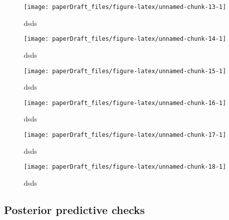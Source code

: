 \documentclass[
  12pt,
  dvipsnames,enabledeprecatedfontcommands]{scrartcl}
\begin{document}
\begin{figure}[H]


\begin{center}\texttt{[image: paperDraft\_files/figure-latex/unnamed-chunk-13-1]} \end{center}
\caption{dsds}
\label{fig:genderGoogle}
\end{figure}

\begin{figure}[H]

\begin{center}\texttt{[image: paperDraft\_files/figure-latex/unnamed-chunk-14-1]} \end{center}
\caption{dsds}
\label{fig:genderGlove}
\end{figure}

\begin{figure}[H]

\begin{center}\texttt{[image: paperDraft\_files/figure-latex/unnamed-chunk-15-1]} \end{center}
\caption{dsds}
\label{fig:genderReddit}
\end{figure}

\begin{figure}[H]

\begin{center}\texttt{[image: paperDraft\_files/figure-latex/unnamed-chunk-16-1]} \end{center}
\caption{dsds}
\label{fig:debiasedReligion}
\end{figure}

\begin{figure}[H]

\begin{center}\texttt{[image: paperDraft\_files/figure-latex/unnamed-chunk-17-1]} \end{center}
\caption{dsds}
\label{fig:debiasedRace}
\end{figure}

\begin{figure}[H]

\begin{center}\texttt{[image: paperDraft\_files/figure-latex/unnamed-chunk-18-1]} \end{center}
\caption{dsds}
\label{fig:debiasedGender}
\end{figure}

\hypertarget{posterior-predictive-checks}{%
\subsection{Posterior predictive
checks}\label{posterior-predictive-checks}}
\end{document}

